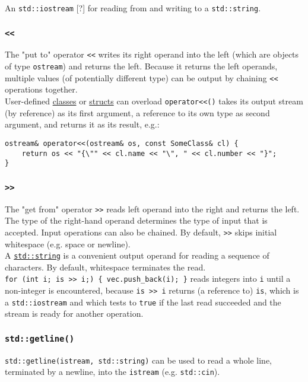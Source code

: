 \documentclass[8pt, table, xcdraw]{article}%
\begin{document}
An \lstinline{std::iostream} [?] for reading from and writing to a \lstinline{std::string}.

\subsubsection{\lstinline{<<}}
The "put to" operator \lstinline{<<} writes its right operand into the left (which are objects of type \lstinline{ostream}) and returns the left. Because it returns the left operands, multiple values (of potentially different type) can be output by chaining \lstinline{<<} operations together.\\
User-defined \hyperref[class]{classes} or \hyperref[struct]{structs} can overload \lstinline{operator<<()} takes its output stream (by reference) as its first argument, a reference to its own type as second argument, and returns it as its result, e.g.:

\begin{lstlisting}
ostream& operator<<(ostream& os, const SomeClass& cl) {
    return os << "{\"" << cl.name << "\", " << cl.number << "}";
}
\end{lstlisting}

\subsubsection{\lstinline{>>}}
The "get from" operator \lstinline{>>} reads left operand into the right and returns the left. The type of the right-hand operand determines the type of input that is accepted. Input operations can also be chained. By default,
\lstinline{>>} skips initial whitespace (e.g. space or newline).\\
A \hyperref[string]{\lstinline{std::string}} is a convenient output operand for reading a sequence of characters. By default, whitespace terminates the read.\\
\lstinline|for (int i; is >> i;) { vec.push_back(i); }| reads integers into \lstinline{i} until a non-integer is encountered, because \lstinline{is >> i} returns (a reference to) \lstinline{is}, which is a \lstinline{std::iostream} and which tests to \lstinline{true} if the last read succeeded and the stream is ready for another operation.

\subsubsection{\lstinline{std::getline()}}

\lstinline{std::getline(istream, std::string)} can be used to read a whole line, terminated by a newline, into the \lstinline{istream} (e.g. \lstinline{std::cin}).
\end{document}
